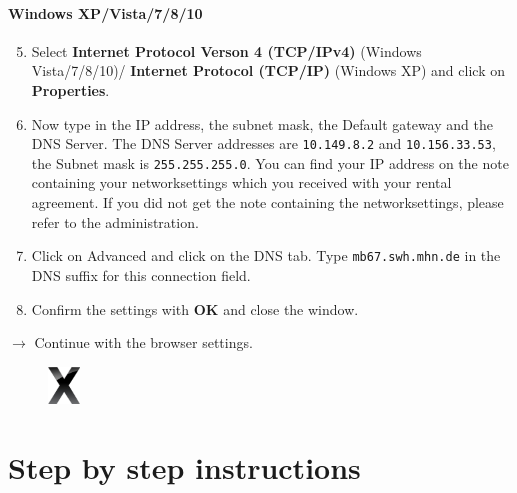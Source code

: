 \documentclass[a4paper,12pt]{scrartcl}
\newcommand{\optemph}[1]{\textbf{#1}}
\begin{document}
\paragraph*{Windows XP/Vista/7/8/10}
\begin{enumerate}
    \setcounter{enumi}{4}
	\item Select \optemph{Internet Protocol Verson 4 (TCP/IPv4)} (Windows Vista/7/8/10)/ \optemph{Internet Protocol  (TCP/IP)} (Windows XP) and click on \optemph{Properties}.
	\item Now type in the IP address, the subnet mask, the Default gateway and the DNS Server. The DNS Server addresses are \nolinkurl{10.149.8.2}  and \nolinkurl{10.156.33.53}, the Subnet mask is \nolinkurl{255.255.255.0}. You can find your IP address on the note containing your networksettings which you received with your rental agreement. If you did not get the note containing the networksettings, please refer to the administration.
    \item Click on Advanced and click on the DNS tab. Type \nolinkurl{mb67.swh.mhn.de} in the DNS suffix for this connection field.
	\item Confirm the settings with \optemph{OK} and close the window.
\end{enumerate}
$\rightarrow$ Continue with the browser settings.



\newpage

\begin{figure}[t!]
    \raggedleft
    \vspace{-20pt}
    \includegraphics[height=1cm,keepaspectratio]{Bilder/OSXLeopard}
    \vspace{-20pt}
\end{figure}

\section*{Step by step instructions}
\end{document}
